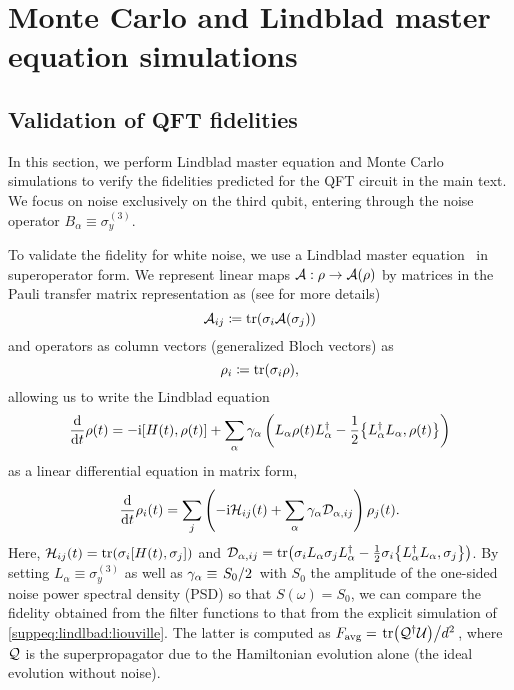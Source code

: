 \chapter{Monte Carlo and Lindblad master equation simulations}
\section{Validation of QFT fidelities}
In this section, we perform Lindblad master equation and Monte Carlo simulations to verify the fidelities predicted for the QFT circuit in the main text. We focus on noise exclusively on the third qubit, entering through the noise operator $B_\alpha\equiv\sigma_y^{(3)}$. 

To validate the fidelity for white noise, we use a Lindblad master equation~\cite{Lindblad1976,Gorini1976} in superoperator form. We represent linear maps $\mathcal{A}: \rho\rightarrow\mathcal{A}(\rho)$ by matrices in the Pauli transfer matrix representation as (see  for more details)
\begin{equation}
    \mathcal{A}_{ij} \coloneqq \tr(\sigma_i\mathcal{A}(\sigma_j))
\end{equation}
and operators as column vectors (\ie generalized Bloch vectors) as
\begin{equation}
    \rho_i \coloneqq \tr(\sigma_i\rho),
\end{equation}
allowing us to write the Lindblad equation
\begin{equation}
    \dv{t}\rho(t) = -\i\comm{H(t)}{\rho(t)} + \sum_\alpha \gamma_\alpha\left(L_\alpha\rho(t) L_\alpha\adjoint - \frac{1}{2}\acomm{L_\alpha\adjoint L_\alpha}{\rho(t)}\right)
\end{equation}
as a linear differential equation in matrix form,
\begin{equation}\label{suppeq:lindlbad:liouville}
    \dv{t}\rho_i(t) = \sum_j\left(-\mathrm{i}\mathcal{H}_{ij}(t)+ \sum_\alpha \gamma_\alpha \mathcal{D}_{\alpha, ij}\right)\rho_j(t).
\end{equation}
Here, $\mc{H}_{ij}(t) = \tr(\sigma_i\comm{H(t)}{\sigma_j})$ and $\mc{D}_{\alpha, ij} = \tr(\sigma_i L_\alpha\sigma_j L_\alpha\adjoint - \frac{1}{2}\sigma_i \acomm{L_\alpha\adjoint L_\alpha}{\sigma_j})$. By setting $L_\alpha\equiv\sigma_y^{(3)}$ as well as $\gamma_\alpha\equiv\flatfrac{S_0}{2}$ with $S_0$ the amplitude of the one-sided noise power spectral density (PSD) so that $S(\omega) = S_0$, we can compare the fidelity obtained from the filter functions to that from the explicit simulation of \cref{suppeq:lindlbad:liouville}. The latter is computed as $\avgfid = \flatfrac{\tr(\mc{Q}\adjoint\mc{U})}{d^2}$, where $\mathcal{Q}$ is the superpropagator due to the Hamiltonian evolution alone (\ie the ideal evolution without noise).

